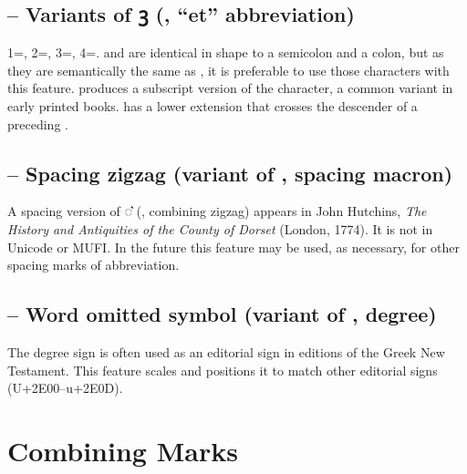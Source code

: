 \subsection{ – Variants of ꝫ (, “et” abbreviation)}
1=, 2=, 3=, 4=. \textSourceText{[1]} and \textSourceText{[3]} are
identical in shape to a semicolon and a colon, but as they are semantically the same as ,
it is preferable to use those
characters with this feature. \textSourceText{[2]} produces a subscript version of
the character, a common variant in early printed books. \textSourceText{[4]} has a lower extension that
crosses the descender of a preceding .

\subsection{ – Spacing zigzag (variant of , spacing macron)}
A spacing version of ◌͛ (, combining zigzag) appears in John Hutchins,
\textit{The History and Antiquities of the County of Dorset} (London, 1774). It
is not in Unicode or MUFI. In the future this feature may be used, as necessary,
for other spacing marks of abbreviation.

\subsection{ – Word omitted symbol (variant of , degree)}
The degree sign is often used as an editorial sign in editions of the Greek New Testament. This feature
scales and positions it to match other editorial signs (U+2E00--u+2E0D).

\section{Combining Marks}

